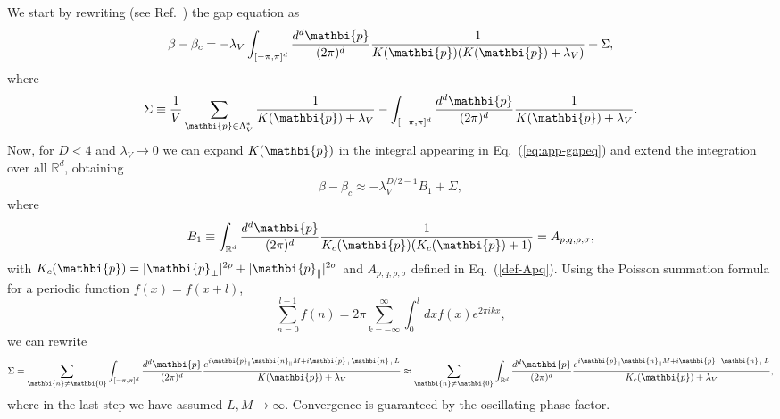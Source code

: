 \documentclass[a4paper,12pt]{article}
\newcommand{\pos}[1]{\mathbi{#1}}
\begin{document}
We start by rewriting (see Ref.~\cite{Brezin82}) the gap equation as
\begin{equation}
\label{eq:app-gapeq}
\beta - \beta_c = - \lambda_V \int_{[-\pi,\pi]^d}
   \frac{d^d\pos{p}}{(2\pi)^d} \frac{1}{K(\pos{p}) 
(K(\pos{p})+\lambda_V)} +
    \Sigma,
\end{equation}
where
\begin{equation}
\Sigma \equiv \frac{1}{V}\sum_{\pos{p} \in
   \Lambda_V^*}\frac{1}{K(\pos{p})+\lambda_V} -
\int_{[-\pi,\pi]^d} \frac{d^d\pos{p}}{(2\pi)^d} 
\frac{1}{K(\pos{p})+\lambda_V}.
\end{equation}
Now, for $D<4$ and $\lambda_V\to 0$ we can expand $K(\pos{p})$ in the 
integral
appearing in Eq.~(\ref{eq:app-gapeq}) and extend the integration over 
all
$\mathbb{R}^d$, obtaining
\begin{equation}
\label{appA:gap}
\beta - \beta_c \approx - \lambda_V^{D/2-1} B_1 + \Sigma,
\end{equation}
where
\begin{equation}
B_1 \equiv
\int_{\mathbb{R}^d} \frac{d^{d}\pos{p}}{(2\pi)^{d}}
     \frac{1}{K_c(\pos{p})(K_c(\pos{p})+1)} = 
   A_{p,q,\rho,\sigma},
\end{equation}
with $K_c(\pos{p}) = |\pos{p}_\bot|^{2\rho} + |\pos{p}_\||^{2 \sigma}$
and $A_{p,q,\rho,\sigma}$ defined in Eq.~(\ref{def-Apq}).
Using the Poisson summation formula for a periodic function 
$f(x) = f(x+l)$, 
\begin{equation}
   \sum_{n=0}^{l-1} f(n) = 2\pi \sum_{k=-\infty}^\infty 
    \int_0^l dx f(x) e^{2\pi i kx} ,
\label{eq:poisson}
\end{equation}
we can rewrite
\begin{equation}
\label{eq:ursigma}
\Sigma  =  \sum_{\pos{n}\neq\pos{0}} \int_{[-\pi,\pi]^d}
\frac{d^d\pos{p}}{(2\pi)^d} \frac{e^{i \pos{p}_\| \pos{n}_\| M+i
     \pos{p}_\bot \pos{n}_\bot L}}{K(\pos{p})+\lambda_V} 
\approx
\sum_{\pos{n}\neq\pos{0}} \int_{\mathbb{R}^d}
\frac{d^d\pos{p}}{(2\pi)^d} \frac{e^{i \pos{p}_\| \pos{n}_\| M+i
     \pos{p}_\bot \pos{n}_\bot L}}{K_c(\pos{p})+\lambda_V},
\end{equation}
where in the last step we have assumed $L,M\to \infty$.
Convergence is guaranteed by the oscillating phase factor.
\end{document}
